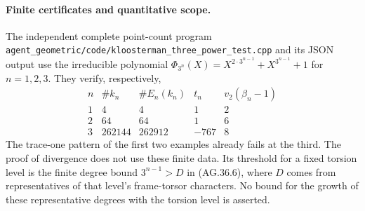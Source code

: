 \paragraph{Finite certificates and quantitative scope.}
The independent complete point-count program
\texttt{agent\_geometric/code/kloosterman\_three\_power\_test.cpp}
and its JSON output use the irreducible polynomial
\(\Phi_{3^n}(X)=X^{2\cdot3^{n-1}}+X^{3^{n-1}}+1\)
for \(n=1,2,3\). They verify, respectively,
\[
\begin{array}{c|r|r|r|r}
 n&\#k_n&\#E_n(k_n)&t_n&v_2(\beta_n-1)\\\hline
 1&4&4&1&2\\
 2&64&64&1&6\\
 3&262144&262912&-767&8
\end{array}
\]
The trace-one pattern of the first two examples already
fails at the third. The proof of divergence does not use
these finite data. Its threshold for a fixed torsion level
is the finite degree bound \(3^{n-1}>D\) in (AG.36.6),
where \(D\) comes from representatives of that level's
frame-torsor characters. No bound for the growth of these
representative degrees with the torsion level is asserted.
